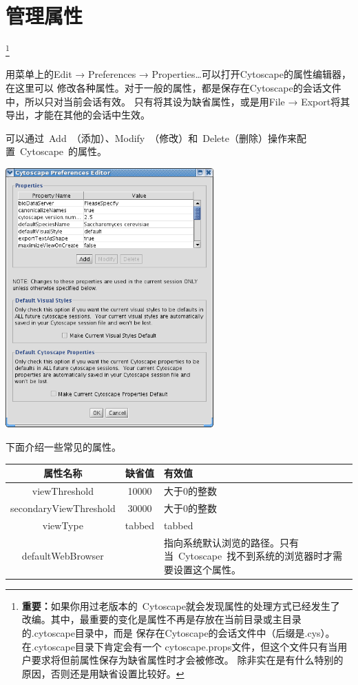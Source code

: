 \section{管理属性}
\footnote{{\bf 重要：}如果你用过老版本的~Cytoscape就会发现属性的处理方式已经发生了
改编。其中，最重要的变化是属性不再是存放在当前目录或主目录的.cytoscape目录中，而是
保存在Cytoscape的会话文件中（后缀是.cys）。在.cytoscape目录下肯定会有一个
cytoscape.props文件，但这个文件只有当用户要求将但前属性保存为缺省属性时才会被修改。
除非实在是有什么特别的原因，否则还是用缺省设置比较好。}

用菜单上的Edit → Preferences → Properties…可以打开Cytoscape的属性编辑器，在这里可以
修改各种属性。对于一般的属性，都是保存在Cytoscape的会话文件中，所以只对当前会话有效。
只有将其设为缺省属性，或是用File → Export将其导出，才能在其他的会话中生效。

可以通过~Add~（添加）、Modify~（修改）和~Delete（删除）操作来配置~Cytoscape~的属性。\\
\begin{center}
\includegraphics[width=0.6\textwidth]{images/prefs_editor.png} 
\end{center}

 下面介绍一些常见的属性。
\begin{table}[!h]
\center
\begin{tabular}{|c|c|p{5.5cm}|}
\hline 
 \textbf{属性名称}& \textbf{缺省值}& \textbf{有效值}\\ \hline
 viewThreshold& 10000&大于0的整数\\ \hline
 secondaryViewThreshold& 30000& 大于0的整数 \\ \hline
 viewType& tabbed& tabbed \\ \hline
 defaultWebBrowser & &
 指向系统默认浏览的路径。只有当~Cytoscape~找不到系统的浏览器时才需要设置这个属性。\\
 \hline 
\end{tabular}
\end{table}

